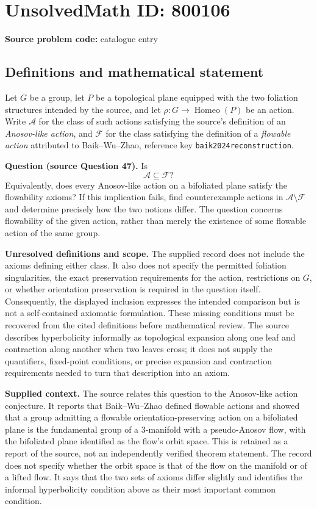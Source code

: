 \documentclass[11pt]{article}
\begin{document}
\section*{UnsolvedMath ID: 800106}
\textbf{Source problem code:} catalogue entry
\subsection{Definitions and mathematical statement}
Let \(G\) be a group, let \(P\) be a topological plane equipped with the two foliation structures intended by the source, and let \(\rho\colon G\to\operatorname{Homeo}(P)\) be an action. Write \(\mathcal A\) for the class of such actions satisfying the source's definition of an \emph{Anosov-like action}, and \(\mathcal F\) for the class satisfying the definition of a \emph{flowable action} attributed to Baik--Wu--Zhao, reference key \texttt{baik2024reconstruction}.

\textbf{Question (source Question 47).} Is
\[
\mathcal A\subseteq\mathcal F?
\]
Equivalently, does every Anosov-like action on a bifoliated plane satisfy the flowability axioms? If this implication fails, find counterexample actions in \(\mathcal A\setminus\mathcal F\) and determine precisely how the two notions differ. The question concerns flowability of the given action, rather than merely the existence of some flowable action of the same group.

\textbf{Unresolved definitions and scope.} The supplied record does not include the axioms defining either class. It also does not specify the permitted foliation singularities, the exact preservation requirements for the action, restrictions on \(G\), or whether orientation preservation is required in the question itself. Consequently, the displayed inclusion expresses the intended comparison but is not a self-contained axiomatic formulation. These missing conditions must be recovered from the cited definitions before mathematical review. The source describes hyperbolicity informally as topological expansion along one leaf and contraction along another when two leaves cross; it does not supply the quantifiers, fixed-point conditions, or precise expansion and contraction requirements needed to turn that description into an axiom.

\textbf{Supplied context.} The source relates this question to the Anosov-like action conjecture. It reports that Baik--Wu--Zhao defined flowable actions and showed that a group admitting a flowable orientation-preserving action on a bifoliated plane is the fundamental group of a \(3\)-manifold with a pseudo-Anosov flow, with the bifoliated plane identified as the flow's orbit space. This is retained as a report of the source, not an independently verified theorem statement. The record does not specify whether the orbit space is that of the flow on the manifold or of a lifted flow. It says that the two sets of axioms differ slightly and identifies the informal hyperbolicity condition above as their most important common condition.
\end{document}
